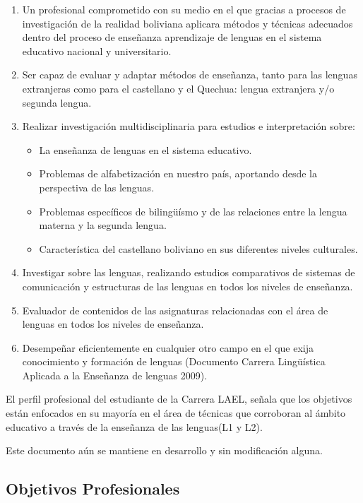 \begin{enumerate}

\item Un profesional comprometido con su medio en el que gracias a procesos de
investigación de la realidad boliviana aplicara métodos y técnicas
adecuados dentro del proceso de enseñanza aprendizaje de lenguas en el 
sistema educativo nacional y universitario.
\item Ser capaz de evaluar y adaptar métodos de enseñanza, tanto para
las lenguas extranjeras como para el castellano y el Quechua: lengua extranjera
y/o segunda lengua.
\item Realizar investigación multidisciplinaria para estudios e 
interpretación sobre:
	\begin{itemize}
	
	\item La enseñanza de lenguas en el sistema educativo.
	\item Problemas de alfabetización en nuestro país, aportando desde la
	perspectiva de las lenguas.
	\item Problemas específicos de bilingüísmo y de las relaciones entre 
	la lengua materna y la segunda lengua.
	\item Característica del castellano boliviano en sus diferentes niveles
	culturales.
	
	\end{itemize}
\item Investigar sobre las lenguas, realizando estudios comparativos de sistemas
de comunicación y estructuras de las lenguas en todos los niveles de 
enseñanza.
\item Evaluador de contenidos de las asignaturas relacionadas con el área de
lenguas en todos los niveles de enseñanza.
\item Desempeñar eficientemente en cualquier otro campo en el que exija 
conocimiento y formación de lenguas (Documento Carrera Lingüística 
Aplicada a la Enseñanza de lenguas 2009).

\end{enumerate}

El perfil profesional del estudiante de la Carrera LAEL, señala que los
objetivos están enfocados en su mayoría en el área de técnicas que corroboran
al ámbito educativo a través de la enseñanza de las lenguas(L1 y L2).

Este documento aún se mantiene en desarrollo y sin modificación alguna.
\cite{Q2014}

\subsection{Objetivos Profesionales}


